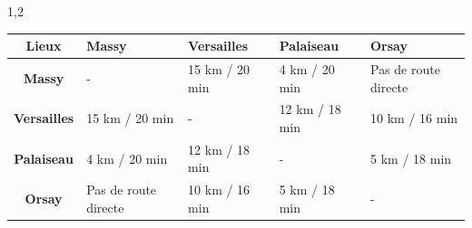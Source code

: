 \documentclass[11pt,a4paper]{exam}
\begin{document}
\begin{spacing}{1,2}
\begin{questions}
        	\begin{tabularx}{\textwidth}{|c|Y|Y|Y|Y|}
        		\hline
        		\textbf{Lieux} & \textbf{Massy} & \textbf{Versailles} & \textbf{Palaiseau} & \textbf{Orsay} \\
        		\hline
        		\textbf{Massy} &  - & 15 km / 20 min & 4 km / 20 min & Pas de route directe \\
        		\hline
        		\textbf{Versailles} & 15 km / 20 min &  - & 12 km / 18 min & 10 km / 16 min \\
        		\hline
        		\textbf{Palaiseau} & 4 km / 20 min & 12 km / 18 min &  - & 5 km / 18 min \\
        		\hline
        		\textbf{Orsay} & Pas de route directe & 10 km / 16 min & 5 km / 18 min &  - \\
        		\hline
        	\end{tabularx}
        	
\end{questions}
\end{spacing}
\end{document}
